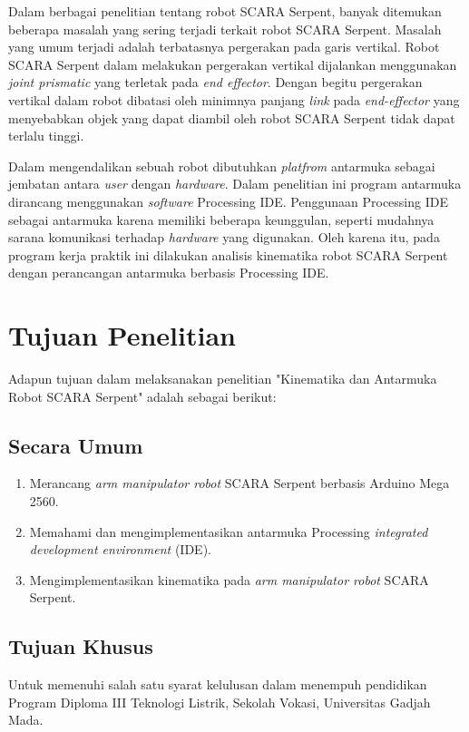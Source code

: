 Dalam berbagai penelitian tentang robot SCARA Serpent, banyak ditemukan beberapa masalah yang sering terjadi terkait robot SCARA Serpent. Masalah yang umum terjadi adalah terbatasnya pergerakan pada garis vertikal. Robot SCARA Serpent dalam melakukan pergerakan vertikal dijalankan menggunakan \textit{joint prismatic} yang terletak pada \textit{end effector}. Dengan begitu pergerakan vertikal dalam robot dibatasi oleh minimnya panjang \textit{link} pada \textit{end-effector} yang menyebabkan objek yang dapat diambil oleh robot SCARA Serpent tidak dapat terlalu tinggi.

Dalam mengendalikan sebuah robot dibutuhkan \textit{platfrom} antarmuka sebagai jembatan antara \textit{user} dengan \emph{hardware}. Dalam penelitian ini program antarmuka dirancang menggunakan \textit{software} Processing IDE. Penggunaan Processing IDE sebagai antarmuka karena memiliki beberapa keunggulan, seperti mudahnya sarana komunikasi terhadap \emph {hardware} yang digunakan. Oleh karena itu, pada program kerja praktik ini dilakukan analisis kinematika robot SCARA Serpent dengan perancangan antarmuka berbasis  Processing IDE.\\


\section{Tujuan Penelitian}
Adapun tujuan dalam melaksanakan penelitian "Kinematika dan Antarmuka Robot SCARA Serpent" adalah sebagai berikut:

\subsection{Secara Umum}
\begin{enumerate}
	\item Merancang\emph{ arm manipulator robot} SCARA Serpent berbasis Arduino Mega 2560.
	\item Memahami dan mengimplementasikan antarmuka Processing \textit{integrated development environment} (IDE).
	\item Mengimplementasikan kinematika pada \emph{arm manipulator robot} SCARA Serpent.
\end{enumerate}
\subsection{Tujuan Khusus}
Untuk memenuhi salah satu syarat kelulusan dalam menempuh pendidikan Program   Diploma III Teknologi Listrik, Sekolah Vokasi, Universitas Gadjah Mada. 


